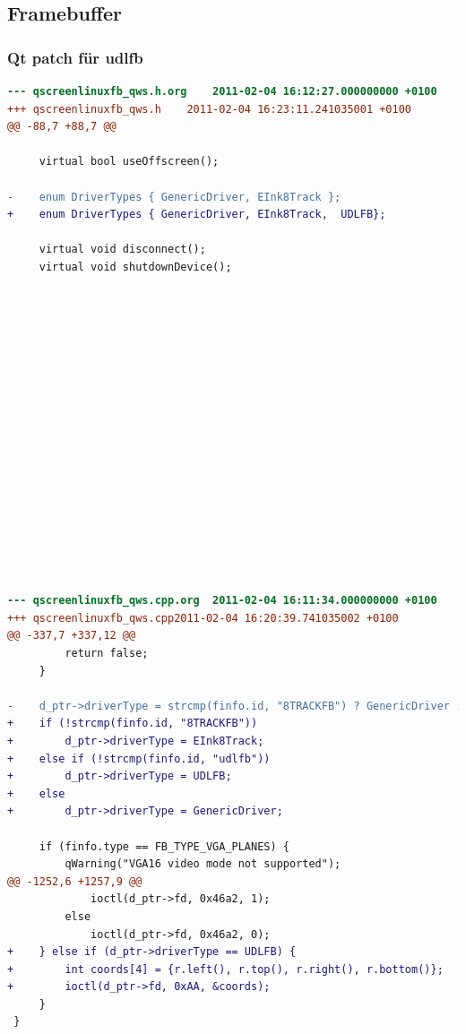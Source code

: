 \documentclass{beamer}
\begin{document}
  \subsection{Framebuffer}
	\begin{frame}
		\frametitle{Qt patch für udlfb}
		\begin{lstlisting}[language=diff, basicstyle=\tiny]
--- qscreenlinuxfb_qws.h.org	2011-02-04 16:12:27.000000000 +0100
+++ qscreenlinuxfb_qws.h	2011-02-04 16:23:11.241035001 +0100
@@ -88,7 +88,7 @@
 
     virtual bool useOffscreen();
 
-    enum DriverTypes { GenericDriver, EInk8Track };
+    enum DriverTypes { GenericDriver, EInk8Track,  UDLFB};
 
     virtual void disconnect();
     virtual void shutdownDevice();	
     
     
     
     
     
     
     
     
     
     
     
     
     
     
     
     
     

--- qscreenlinuxfb_qws.cpp.org	2011-02-04 16:11:34.000000000 +0100
+++ qscreenlinuxfb_qws.cpp2011-02-04 16:20:39.741035002 +0100
@@ -337,7 +337,12 @@
         return false;
     }
 
-    d_ptr->driverType = strcmp(finfo.id, "8TRACKFB") ? GenericDriver : EInk8Track;
+    if (!strcmp(finfo.id, "8TRACKFB"))
+        d_ptr->driverType = EInk8Track;
+    else if (!strcmp(finfo.id, "udlfb"))
+        d_ptr->driverType = UDLFB;
+    else
+        d_ptr->driverType = GenericDriver;
 
     if (finfo.type == FB_TYPE_VGA_PLANES) {
         qWarning("VGA16 video mode not supported");
@@ -1252,6 +1257,9 @@
             ioctl(d_ptr->fd, 0x46a2, 1);
         else
             ioctl(d_ptr->fd, 0x46a2, 0);
+    } else if (d_ptr->driverType == UDLFB) {
+        int coords[4] = {r.left(), r.top(), r.right(), r.bottom()};
+        ioctl(d_ptr->fd, 0xAA, &coords);
     }
 }
		\end{lstlisting}
	\end{frame}
\end{document}
